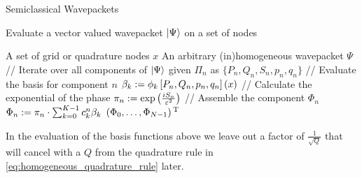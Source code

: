\begin{chapter}{Semiclassical Wavepackets}
\begin{algorithm}
\caption{Evaluate a vector valued wavepacket $\Ket{\Psi}$ on a set of nodes}
\label{al:evaluate_wave_packets_on_grid}
\begin{algorithmic}
  \REQUIRE A set of grid or quadrature nodes $x$
  \REQUIRE An arbitrary (in)homogeneous wavepacket $\Psi$
  \STATE // Iterate over all components of $\Ket{\Psi}$
    \STATE given $\Pi_n$ as $\{P_n,Q_n,S_n,p_n,q_n\}$
    \STATE // Evaluate the basis for component $n$
      \STATE $\beta_k := \phi_k \left[P_n, Q_n, p_n, q_n\right] \left( x \right)$
    \ENDFOR
    \STATE // Calculate the exponential of the phase
    \STATE $\pi_n := \exp\left( \frac{i S_n}{\varepsilon^2} \right)$
    \STATE // Assemble the component $\Phi_n$
    \STATE $\Phi_n := \pi_n \cdot \sum_{k=0}^{K-1} c^n_k \beta_k$
  \ENDFOR
  \RETURN $\left(\Phi_0, \ldots, \Phi_{N-1}\right){}^{\textnormal{T}}$
\end{algorithmic}
\end{algorithm}

In the evaluation of the basis functions above we leave out a factor of
$\frac{1}{\sqrt{Q}}$ that will cancel with a $Q$ from the quadrature rule
in \eqref{eq:homogeneous_quadrature_rule} later.

\end{chapter}
